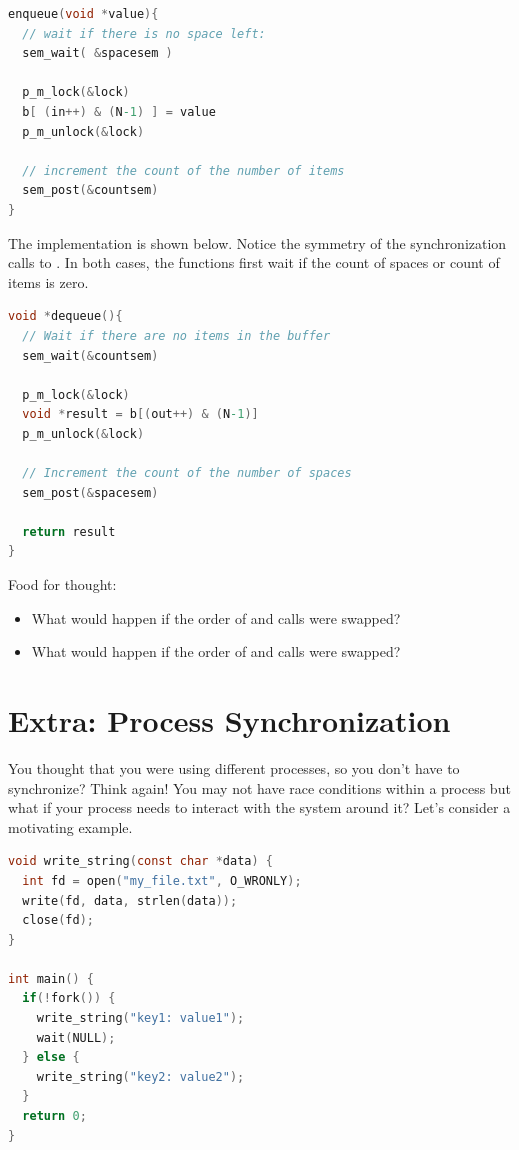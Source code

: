 \begin{lstlisting}[language=C]
enqueue(void *value){
  // wait if there is no space left:
  sem_wait( &spacesem )

  p_m_lock(&lock)
  b[ (in++) & (N-1) ] = value
  p_m_unlock(&lock)

  // increment the count of the number of items
  sem_post(&countsem)
}
\end{lstlisting}

The  implementation is shown below.
Notice the symmetry of the synchronization calls to .
In both cases, the functions first wait if the count of spaces or count of items is zero.

\begin{lstlisting}[language=C]
void *dequeue(){
  // Wait if there are no items in the buffer
  sem_wait(&countsem)

  p_m_lock(&lock)
  void *result = b[(out++) & (N-1)]
  p_m_unlock(&lock)

  // Increment the count of the number of spaces
  sem_post(&spacesem)

  return result
}
\end{lstlisting}

Food for thought:

\begin{itemize}
\tightlist
\item
  What would happen if the order of  and  calls were swapped?
\item
  What would happen if the order of  and  calls were swapped?
\end{itemize}


\section{Extra: Process Synchronization}

You thought that you were using different processes, so you don't have to synchronize?
Think again!
You may not have race conditions within a process but what if your process needs to interact with the system around it?
Let's consider a motivating example.

\begin{lstlisting}[language=C]
void write_string(const char *data) {
  int fd = open("my_file.txt", O_WRONLY);
  write(fd, data, strlen(data));
  close(fd);
}

int main() {
  if(!fork()) {
    write_string("key1: value1");
    wait(NULL);
  } else {
    write_string("key2: value2");
  }
  return 0;
}
\end{lstlisting}

